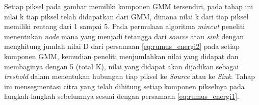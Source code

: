 
Setiap piksel pada gambar memiliki komponen GMM tersendiri, pada tahap ini nilai k
tiap piksel telah didapatkan dari GMM, dimana nilai k dari tiap piksel memiliki rentang
dari 1 sampai 5. Pada permulaan algoritma \emph{mincut} peneliti menentukan \emph{node}
mana yang menjadi tetangga dari \emph{source} atau \emph{sink} dengan menghitung
jumlah nilai D dari persamaan \ref{eq:rumus_energi2} pada setiap komponen GMM, 
kemudian peneliti menjumlahkan nilai yang didapat dan membaginya dengan 5 (total K),
nilai yang didapat akan dijadikan sebagai \emph{treshold} dalam menentukan hubungan
tiap piksel ke \emph{Source} atau ke \emph{Sink}. Tahap ini mensegmentasi citra 
yang telah dihitung setiap komponen pikselnya pada langkah-langkah sebelumnya sesuai 
dengan persamaan \ref{eq:rumus_energi1}.




	


